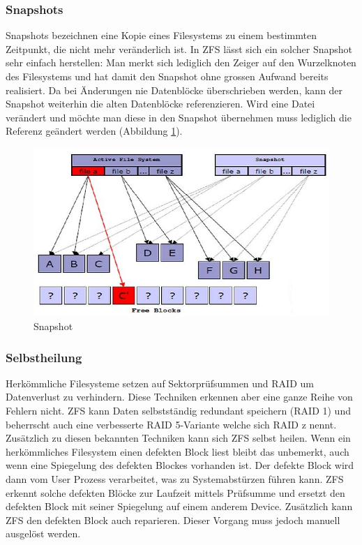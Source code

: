 \subsubsection{Snapshots}

Snapshots bezeichnen eine Kopie eines Filesystems zu einem bestimmten Zeitpunkt, die nicht mehr veränderlich ist. In ZFS lässt sich ein solcher Snapshot sehr einfach herstellen: Man merkt sich lediglich den Zeiger auf den Wurzelknoten des Filesystems und hat damit den Snapshot ohne grossen Aufwand bereits realisiert. Da bei Änderungen nie Datenblöcke überschrieben werden, kann der Snapshot weiterhin die alten Datenblöcke referenzieren. Wird eine Datei verändert und möchte man diese in den Snapshot übernehmen muss lediglich die Referenz geändert werden (Abbildung \ref{fig:snapshot}).

\begin{figure}[h!]
\centering
\includegraphics[width=0.7\linewidth]{fig/snapshot}
\caption{Snapshot}
\label{fig:snapshot}
\end{figure}

\subsubsection{Selbstheilung}

Herkömmliche Filesysteme setzen auf Sektorprüfsummen und RAID um Datenverlust zu verhindern. Diese Techniken erkennen aber eine ganze Reihe von Fehlern nicht. ZFS kann Daten selbstständig redundant speichern (RAID 1) und beherrscht auch eine verbesserte RAID 5-Variante welche sich RAID z nennt. Zusätzlich zu diesen bekannten Techniken kann sich ZFS selbst heilen. Wenn ein herkömmliches Filesystem einen defekten Block liest bleibt das unbemerkt, auch wenn eine Spiegelung des defekten Blockes vorhanden ist. Der defekte Block wird dann vom User Prozess verarbeitet, was zu Systemabstürzen führen kann. ZFS erkennt solche defekten Blöcke zur Laufzeit mittels Prüfsumme und ersetzt den defekten Block mit seiner Spiegelung auf einem anderem Device. Zusätzlich kann ZFS den defekten Block auch reparieren. Dieser Vorgang muss jedoch manuell ausgelöst werden.

